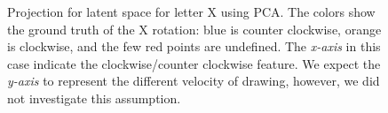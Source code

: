   \begin{figure}[htbp!]
      \centering
      \caption{Projection for latent space for letter X using PCA. The colors show the ground truth of the X rotation: blue is counter clockwise, orange is clockwise, and the few red points are undefined. The \textit{x-axis} in this case indicate the clockwise/counter clockwise feature. We expect the \textit{y-axis} to represent the different velocity of drawing, however, we did not investigate this assumption.}
      \label{fig:x_bottleneck}
  \end{figure}

